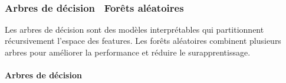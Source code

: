 \documentclass[11pt]{article}
\begin{document}
    \begin{center}
    \end{center}
    { \hspace*{\fill} \\}
    
    \subsubsection{Arbres de décision \ Forêts
aléatoires}\label{arbres-de-duxe9cision-foruxeats-aluxe9atoires}

Les arbres de décision sont des modèles interprétables qui partitionnent
récursivement l'espace des features. Les forêts aléatoires combinent
plusieurs arbres pour améliorer la performance et réduire le
surapprentissage.

\paragraph{Arbres de décision}\label{arbres-de-duxe9cision}
\end{document}
